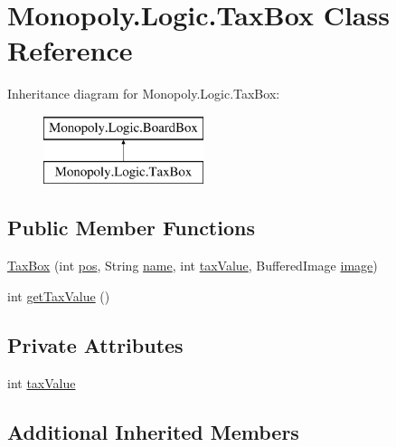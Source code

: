 \hypertarget{class_monopoly_1_1_logic_1_1_tax_box}{}\section{Monopoly.\+Logic.\+Tax\+Box Class Reference}
\label{class_monopoly_1_1_logic_1_1_tax_box}
Inheritance diagram for Monopoly.\+Logic.\+Tax\+Box\+:\begin{figure}[H]
\begin{center}
\leavevmode
\includegraphics[height=2.000000cm]{class_monopoly_1_1_logic_1_1_tax_box}
\end{center}
\end{figure}
\subsection*{Public Member Functions}
\begin{DoxyCompactItemize}
\item 
\hyperlink{class_monopoly_1_1_logic_1_1_tax_box_abe4f52480d8bdbca5f480973644bd530}{Tax\+Box} (int \hyperlink{class_monopoly_1_1_logic_1_1_board_box_a750c8300a134809e0eb5772b3ba92258}{pos}, String \hyperlink{class_monopoly_1_1_logic_1_1_board_box_ad5cd8d9fc191dc2df82b9fe7766210fd}{name}, int \hyperlink{class_monopoly_1_1_logic_1_1_tax_box_a006558e6ac0b75b55480cc0fced64115}{tax\+Value}, Buffered\+Image \hyperlink{class_monopoly_1_1_logic_1_1_board_box_a7d9f613b72c69740867388b59649d127}{image})
\item 
int \hyperlink{class_monopoly_1_1_logic_1_1_tax_box_a3e7d5fe75e6a1d91b94b2363c06e8651}{get\+Tax\+Value} ()
\end{DoxyCompactItemize}
\subsection*{Private Attributes}
\begin{DoxyCompactItemize}
\item 
int \hyperlink{class_monopoly_1_1_logic_1_1_tax_box_a006558e6ac0b75b55480cc0fced64115}{tax\+Value}
\end{DoxyCompactItemize}
\subsection*{Additional Inherited Members}


